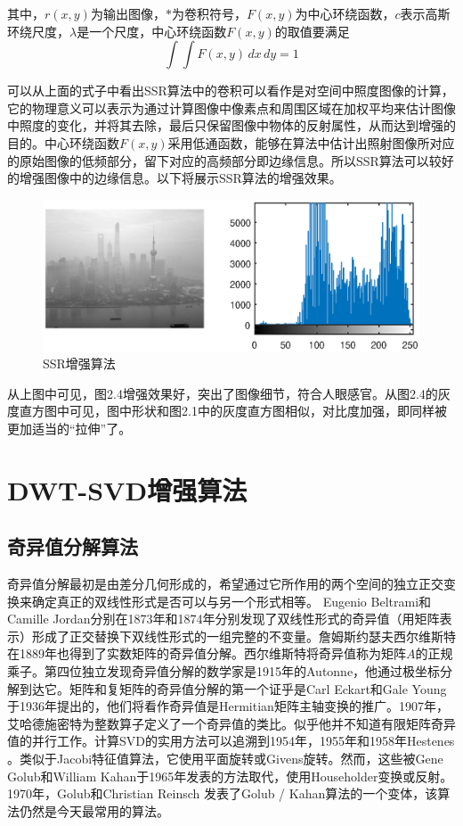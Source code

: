 \documentclass[12pt]{book}
\begin{document}
其中，$r(x,y)$为输出图像，$*$为卷积符号，$F(x,y)$为中心环绕函数，$c$表示高斯环绕尺度，$\lambda$是一个尺度，中心环绕函数$F(x,y)$的取值要满足
\begin{equation}     \int\int F(x,y)\,dx \,dy=1    \end{equation}

可以从上面的式子中看出SSR算法中的卷积可以看作是对空间中照度图像的计算，它的物理意义可以表示为通过计算图像中像素点和周围区域在加权平均来估计图像中照度的变化，并将其去除，最后只保留图像中物体的反射属性，从而达到增强的目的。中心环绕函数$F(x,y)$采用低通函数，能够在算法中估计出照射图像所对应的原始图像的低频部分，留下对应的高频部分即边缘信息。所以SSR算法可以较好的增强图像中的边缘信息。以下将展示SSR算法的增强效果。
			\begin{figure}[!ht]\centering
				\includegraphics[totalheight=60mm]{./figures/ssr2.eps}
				\caption{SSR增强算法\label{SSR}}
			\end{figure}

从上图中可见，图2.4增强效果好，突出了图像细节，符合人眼感官。从图2.4的灰度直方图中可见，图中形状和图2.1中的灰度直方图相似，对比度加强，即同样被更加适当的“拉伸”了。
	\chapter{DWT-SVD增强算法}
		\section{奇异值分解算法}奇异值分解最初是由差分几何形成的，希望通过它所作用的两个空间的独立正交变换来确定真正的双线性形式是否可以与另一个形式相等。 Eugenio Beltrami和Camille Jordan分别在1873年和1874年分别发现了双线性形式的奇异值（用矩阵表示）形成了正交替换下双线性形式的一组完整的不变量。詹姆斯约瑟夫西尔维斯特在1889年也得到了实数矩阵的奇异值分解。西尔维斯特将奇异值称为矩阵$A$的正规乘子。第四位独立发现奇异值分解的数学家是1915年的Autonne，他通过极坐标分解到达它。矩阵和复矩阵的奇异值分解的第一个证乎是Carl Eckart和Gale Young于1936年提出的，他们将看作奇异值是Hermitian矩阵主轴变换的推广。1907年，艾哈德施密特为整数算子定义了一个奇异值的类比。似乎他并不知道有限矩阵奇异值的并行工作。计算SVD的实用方法可以追溯到1954年，1955年和1958年Hestenes 。类似于Jacobi特征值算法，它使用平面旋转或Givens旋转。然而，这些被Gene Golub和William Kahan于1965年发表的方法取代，使用Householder变换或反射。 1970年，Golub和Christian Reinsch 发表了Golub / Kahan算法的一个变体，该算法仍然是今天最常用的算法。
\end{document}

